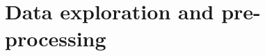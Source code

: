 \newpage\section{Data exploration and pre-processing} \label{section: Data exploration and pre-processing}

